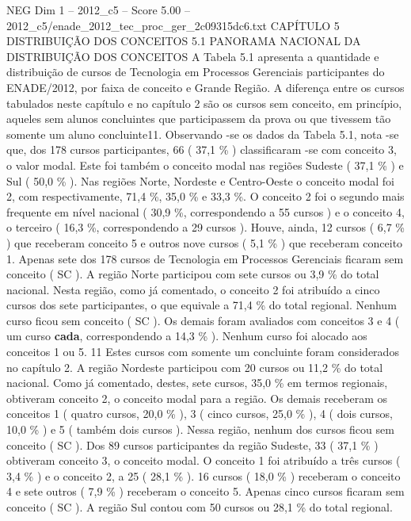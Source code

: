 \begin{textsample}{NEG Dim 1 – 2012\_c5 – Score 5.00 – 2012\_c5/enade\_2012\_tec\_proc\_ger\_2c09315dc6.txt}  \label{ex:f1_neg_325}
CAPÍTULO 5 DISTRIBUIÇÃO DOS CONCEITOS 5.1 PANORAMA NACIONAL DA DISTRIBUIÇÃO DOS CONCEITOS A Tabela 5.1 apresenta a quantidade e distribuição de cursos de Tecnologia em Processos Gerenciais participantes do ENADE/2012, por faixa de conceito e Grande Região.
A diferença entre os cursos tabulados neste capítulo e no capítulo 2 são os cursos sem conceito, em princípio, aqueles sem alunos concluintes que participassem da prova ou que tivessem tão somente um aluno concluinte11.
Observando -se os dados da Tabela 5.1, nota -se que, dos 178 cursos participantes, 66 ( 37,1 \% ) classificaram -se com conceito 3, o valor modal.
Este foi também o conceito modal nas regiões Sudeste ( 37,1 \% ) e Sul ( 50,0 \% ).
Nas regiões Norte, Nordeste e Centro-Oeste o conceito modal foi 2, com respectivamente, 71,4 \%, 35,0 \% e 33,3 \%.
O conceito 2 foi o segundo mais frequente em nível nacional ( 30,9 \%, correspondendo a 55 cursos ) e o conceito 4, o terceiro ( 16,3 \%, correspondendo a 29 cursos ).
Houve, ainda, 12 cursos ( 6,7 \% ) que receberam conceito 5 e outros nove cursos ( 5,1 \% ) que receberam conceito 1.
Apenas sete dos 178 cursos de Tecnologia em Processos Gerenciais ficaram sem conceito ( SC ).
A região Norte participou com sete cursos ou 3,9 \% do total nacional.
Nesta região, como já comentado, o conceito 2 foi atribuído a cinco cursos dos sete participantes, o que equivale a 71,4 \% do total regional.
Nenhum curso ficou sem conceito ( SC ).
Os demais foram avaliados com conceitos 3 e 4 ( um curso \textbf{cada}, correspondendo a 14,3 \% ).
Nenhum curso foi alocado aos conceitos 1 ou 5. 11 Estes cursos com somente um concluinte foram considerados no capítulo 2.
A região Nordeste participou com 20 cursos ou 11,2 \% do total nacional.
Como já comentado, destes, sete cursos, 35,0 \% em termos regionais, obtiveram conceito 2, o conceito modal para a região.
Os demais receberam os conceitos 1 ( quatro cursos, 20,0 \% ), 3 ( cinco cursos, 25,0 \% ), 4 ( dois cursos, 10,0 \% ) e 5 ( também dois cursos ).
Nessa região, nenhum dos cursos ficou sem conceito ( SC ).
Dos 89 cursos participantes da região Sudeste, 33 ( 37,1 \% ) obtiveram conceito 3, o conceito modal.
O conceito 1 foi atribuído a três cursos ( 3,4 \% ) e o conceito 2, a 25 ( 28,1 \% ). 16 cursos ( 18,0 \% ) receberam o conceito 4 e sete outros ( 7,9 \% ) receberam o conceito 5.
Apenas cinco cursos ficaram sem conceito ( SC ).
A região Sul contou com 50 cursos ou 28,1 \% do total regional.

\end{textsample}

